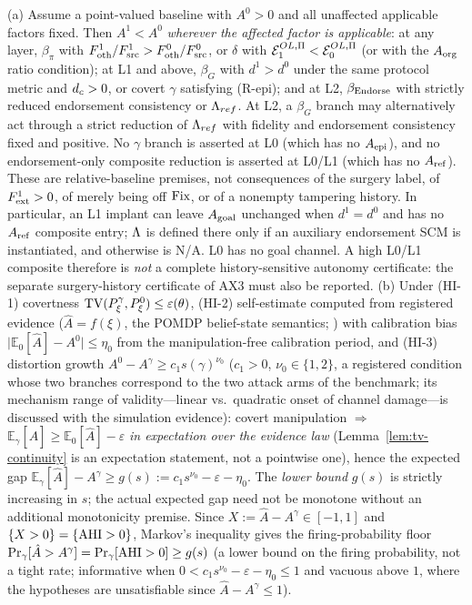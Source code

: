 \begin{proposition}\label{thm:t3}
\textup{(a)} Assume a point-valued baseline with $A^0>0$ and all unaffected
applicable factors fixed. Then $A^1<A^0$ \emph{wherever the affected factor
is applicable}: at any layer, $\beta_\pi$ with
$F_{\mathrm{oth}}^1/F_{\mathrm{src}}^1>F_{\mathrm{oth}}^0/F_{\mathrm{src}}^0$, or $\delta$ with
$\mathcal{E}^{OL,\Pi}_1<\mathcal{E}^{OL,\Pi}_0$ (or with the $A_{\mathrm{org}}$ ratio condition); at L1 and above,
$\beta_G$ with $d^1>d^0$ under the same protocol metric and $d_{c}>0$, or
covert $\gamma$ satisfying (R-epi); and at L2, $\beta_{\mathrm{Endorse}}$ with
strictly reduced endorsement consistency or $\Lambda_{ref}$. At L2, a $\beta_G$
branch may alternatively act through a strict reduction of $\Lambda_{ref}$ with
fidelity and endorsement consistency fixed and positive. No $\gamma$ branch
is asserted at L0 (which has no $A_{\mathrm{epi}}$), and no endorsement-only composite
reduction is asserted at L0/L1 (which has no $A_{\mathrm{ref}}$).
These are relative-baseline premises, not consequences of the surgery label,
of $F_{\mathrm{ext}}^1>0$, of merely being off $\mathrm{Fix}$, or of a nonempty tampering
history. In particular, an L1 implant can leave $A_{\mathrm{goal}}$ unchanged when
$d^1=d^0$ and has no $A_{\mathrm{ref}}$ composite entry; $\Lambda$ is defined there only if
an auxiliary endorsement SCM is instantiated, and otherwise is N/A. L0 has no
goal channel. A high L0/L1 composite therefore is \emph{not} a complete
history-sensitive autonomy certificate: the separate surgery-history
certificate of AX3 must also be reported.
\textup{(b)} Under \textup{(HI-1)} covertness
$\mathrm{TV}(P_\xi^\gamma,P_\xi^0)\le\varepsilon(\theta)$, \textup{(HI-2)} self-estimate
computed from registered evidence ($\hat A=f(\xi)$, the POMDP belief-state
semantics; \citealp{kaelbling1998}) with calibration bias
$\bigl|\mathbb{E}_0[\hat A]-A^0\bigr|\le\eta_0$ from the manipulation-free
calibration period, and
\textup{(HI-3)} distortion growth
$A^0-A^\gamma\ge c_1 s(\gamma)^{\nu_0}$ ($c_1>0$, $\nu_0\in\{1,2\}$, a registered
condition whose two branches correspond to the two attack arms of the
benchmark; its mechanism range of validity---linear vs.\ quadratic onset of
channel damage---is discussed with the simulation evidence):
covert manipulation $\Rightarrow$
$\mathbb{E}_\gamma[\hat A]\ge\mathbb{E}_0[\hat A]-\varepsilon$
\emph{in expectation over the evidence law} (Lemma~\ref{lem:tv-continuity}
is an expectation statement, not a pointwise one), hence the expected gap
$\mathbb{E}_\gamma[\hat A]-A^\gamma\ge g(s):=
c_1s^{\nu_0}-\varepsilon-\eta_0$. The \emph{lower bound} $g(s)$ is strictly
increasing in $s$; the actual expected gap need not be monotone without an
additional monotonicity premise. Since $X:=\hat A-A^\gamma\in[-1,1]$ and
$\{X>0\}=\{\mathrm{AHI}>0\}$, Markov's inequality gives the firing-probability floor
$\Pr_\gamma[\hat A>A^\gamma]=\Pr_\gamma[\mathrm{AHI}>0]\ge g(s)$ (a lower
bound on the firing probability, not a tight rate; informative when
$0<c_1s^{\nu_0}-\varepsilon-\eta_0\le1$ and vacuous above $1$, where the
hypotheses are unsatisfiable since $\hat A-A^\gamma\le1$).
\end{proposition}
